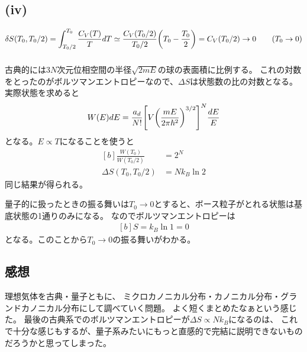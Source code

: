 \documentclass[../../sp_2017.tex]{subfiles}
\begin{document}
\subsection{(iv)}
\begin{equation}\begin{aligned}[b]
    \delta S(T_0,T_0/2) = \int_{T_0/2}^{T_0} \frac{C_V(T)}{T}dT
    \simeq \frac{C_V(T_0/2)}{T_0/2}\qty(T_0-\frac{T_0}{2})
    = C_V(T_0/2) \to 0
    \qquad (T_0\to0)
\end{aligned}\end{equation}

\subsubsection{}
古典的には\(3N\)次元位相空間の半径\(\sqrt{2mE}\)の球の表面積に比例する。
これの対数をとったのがボルツマンエントロピーなので、\(\Delta S\)は状態数の比の対数となる。
実際状態を求めると
\begin{equation}\begin{aligned}[b]
    W(E)dE &= \frac{a_d}{N!}\qty[V\qty(\frac{mE}{2\pi\hbar^2})^{3/2}]^{N}\frac{dE}{E}\\
\end{aligned}\end{equation}
となる。\(E\propto T\)になることを使うと
\begin{equation}\begin{aligned}[b]
    \frac{W(T_0)}{W(T_0/2)} &= 2^N\\
    \Delta S(T_0,T_0/2) &= Nk_B\ln 2
\end{aligned}\end{equation}
同じ結果が得られる。

量子的に扱ったときの振る舞いは\(T_0\to0\)とすると、ボース粒子がとれる状態は基底状態の1通りのみになる。
なのでボルツマンエントロピーは
\begin{equation}\begin{aligned}[b]
    S = k_B\ln 1 =0
\end{aligned}\end{equation}
となる。このことから\(T_0\to 0\)の振る舞いがわかる。


\subsection*{感想}
理想気体を古典・量子ともに、
ミクロカノニカル分布・カノニカル分布・グランドカノニカル分布にして調べていく問題。
よく短くまとめたなぁという感じた。
最後の古典系でのボルツマンエントロピーが\(\Delta S \propto Nk_B\)になるのは、
これで十分な感じもするが、量子系みたいにもっと直感的で完結に説明できないものだろうかと思ってしまった。
\end{document}
